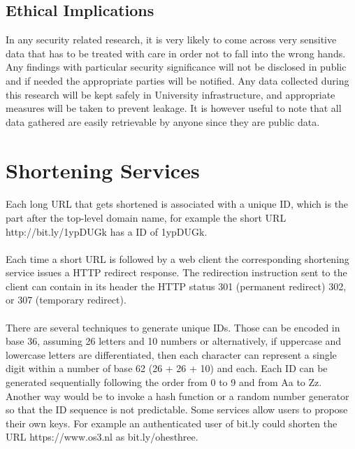 \documentclass[12pt]{article}
\begin{document}
\subsection{Ethical Implications}
In any security related research, it is very likely to come across very sensitive data that has to be treated with care in order not to fall into the wrong hands. Any findings with particular security significance will not be disclosed in public and if needed the appropriate parties will be notified. Any data collected during this research will be kept safely in University infrastructure, and appropriate measures will be taken to prevent leakage. It is however useful to note that all data gathered are easily retrievable by anyone since they are public data.

\newpage

\section{Shortening Services}
\paragraph{}
Each long URL that gets shortened is associated with a unique ID, which is the part after the top-level domain name, for example the short URL http://bit.ly/1ypDUGk has a ID of 1ypDUGk. 
\paragraph{}
Each time a short URL is followed by a web client the corresponding shortening service issues a HTTP redirect response. The redirection instruction sent to the client can contain in its header the HTTP status 301 (permanent redirect) 302, or 307 (temporary redirect).

\paragraph{}
There are several techniques to generate unique IDs. Those can be encoded in base 36, assuming 26 letters and 10 numbers or alternatively, if uppercase and lowercase letters are differentiated, then each character can represent a single digit within a number of base 62 (26 + 26 + 10) and each. Each ID can be generated sequentially following the order from 0 to 9 and from Aa to Zz. Another way would be to invoke a hash function or a random number generator so that the ID sequence is not predictable. Some services allow users to propose their own keys. For example an authenticated user of bit.ly could shorten the URL https://www.os3.nl as bit.ly/ohesthree. 
\end{document}
